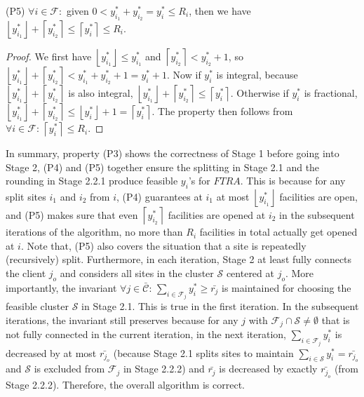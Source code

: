 \documentclass[10pt]{llncs}
\begin{document}
(P5) $\forall i\in\mathcal{F}:$ given $0<y_{i_{1}}^{*}+y_{i_{2}}^{*}=y_{i}^{*}\leq R_{i}$,
then we have $\left\lfloor y_{i_{1}}^{*}\right\rfloor +\left\lceil y_{i_{2}}^{*}\right\rceil \leq\left\lceil y_{i}^{*}\right\rceil \leq R_{i}$.
\begin{proof}
We first have $ $$\left\lfloor y_{i_{1}}^{*}\right\rfloor \leq y_{i_{1}}^{*}$
and $\left\lceil y_{i_{2}}^{*}\right\rceil <y_{i_{2}}^{*}+1$, so
$\left\lfloor y_{i_{1}}^{*}\right\rfloor +\left\lceil y_{i_{2}}^{*}\right\rceil <y_{i_{1}}^{*}+y_{i_{2}}^{*}+1=y_{i}^{*}+1$.
Now if $y_{i}^{*}$ is integral, because $\left\lfloor y_{i_{1}}^{*}\right\rfloor +\left\lceil y_{i_{2}}^{*}\right\rceil $
is also integral, $\left\lfloor y_{i_{1}}^{*}\right\rfloor +\left\lceil y_{i_{2}}^{*}\right\rceil \leq\left\lceil y_{i}^{*}\right\rceil $.
Otherwise if $y_{i}^{*}$ is fractional, $\left\lfloor y_{i_{1}}^{*}\right\rfloor +\left\lceil y_{i_{2}}^{*}\right\rceil \leq\left\lfloor y_{i}^{*}\right\rfloor +1=\left\lceil y_{i}^{*}\right\rceil $.
The property then follows from $\forall i\in\mathcal{F}:\,\left\lceil y_{i}^{*}\right\rceil \leq R_{i}$.
\end{proof}
\medskip{}


In summary, property (P3) shows the correctness of Stage 1 before
going into Stage 2, (P4) and (P5) together ensure the splitting in
Stage 2.1 and the rounding in Stage 2.2.1 produce feasible $y_{i}$'s
for $FTRA$. This is because for any split sites $i_{1}$ and $i_{2}$
from $i$, (P4) guarantees at $i_{1}$ at most $\left\lfloor y_{i_{1}}^{*}\right\rfloor $
facilities are open, and (P5) makes sure that even $\left\lceil y_{i_{2}}^{*}\right\rceil $
facilities are opened at $i_{2}$ in the subsequent iterations of
the algorithm, no more than $R_{i}$ facilities in total actually
get opened at $i$. Note that, (P5) also covers the situation that
a site is repeatedly (recursively) split. Furthermore, in each iteration,
Stage 2 at least fully connects the client $j_{o}$ and considers
all sites in the cluster $\mathcal{S}$ centered at $j_{o}$. More
importantly, the invariant $\forall j\in\bar{\mathcal{C}}:\,\sum_{i\in\mathcal{F}_{j}}y_{i}^{*}\geq\bar{r_{j}}$
is maintained for choosing the feasible cluster $\mathcal{S}$ in
Stage 2.1. This is true in the first iteration. In the subsequent
iterations, the invariant still preserves because for any $j$ with
$\mathcal{F}_{j}\cap\mathcal{S}\neq\emptyset$ that is not fully connected
in the current iteration, in the next iteration, $\sum_{i\in\mathcal{F}_{j}}y_{i}^{*}$
is decreased by at most $\bar{r_{j_{o}}}$ (because Stage 2.1 splits
sites to maintain $\sum_{i\in\mathcal{S}}y_{i}^{*}=\bar{r_{j_{o}}}$
and $\mathcal{S}$ is excluded from $\mathcal{F}_{j}$ in Stage 2.2.2)
and $\bar{r_{j}}$ is decreased by exactly $\bar{r_{j_{o}}}$ (from
Stage 2.2.2). Therefore, the overall algorithm is correct.
\end{document}
